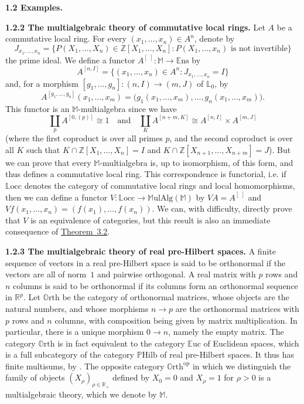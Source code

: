 \documentclass{article}
\newenvironment{rmenv}[1]
  {\phantomsection\par\medskip\noindent\textbf{#1.}\rmfamily}
  {\medskip}
\newcommand{\bb}[1]{{\mathbb{#1}}}
\newcommand{\op}{{\mathrm{op}}}
\newcommand{\Set}{\mathbb{E}\mathrm{ns}}
\newcommand{\MulAlg}{\mathbb{M}\mathrm{ulAlg}}
\newcommand{\Locc}{\mathbb{L}\mathrm{occ}}
\newcommand{\Orth}{\mathbb{O}\mathrm{rth}}
\newcommand{\Euc}{\mathbb{E}\mathrm{uc}}
\newcommand{\PHilb}{\mathbb{P}\mathrm{Hilb}}
\newcommand{\oldpage}[1]{\marginpar{\footnotesize$\Big\vert$ \textit{p.~#1}}}
\begin{document}
\begin{rmenv}{1.2 Examples}
\begin{rmenv}{1.2.2 The multialgebraic theory of commutative local rings}
    Let $A$ be a commutative local ring.
    For every $(x_1,\ldots,x_n)\in A^n$, denote by
    \[
      J_{x_1,\ldots,x_n} =
      \big\{
        P(X_1,\ldots,X_n)\in\bb{Z}[X_1,\ldots,X_n]
        :
        \mbox{$P(X_1,\ldots,x_n)$ is not invertible}
      \big\}
    \]
\oldpage{196}
    the prime ideal.
    We define a functor  $A^{[\,\,]}\colon\bb{M}\to\Set$ by
    \[
      A^{[n,I]}=\{(x_1,\ldots,x_n)\in A^n:J_{x_1,\ldots,x_n}=I\}
    \]
    and, for a morphism $[g_1,\ldots,g_n]\colon(n,I)\to(m,J)$ of $\bb{L}_0$, by
    \[
      A^{[g_1,\ldots,g_n]}(x_1,\ldots,x_m) =
      \big(
        g_1(x_1,\ldots,x_m),
        \ldots,
        g_n(x_1,\ldots,x_m)
      \big).
    \]
    This functor is an $\bb{M}$-multialgebra since we have
    \[
      \coprod_p A^{[0,(p)]} \cong 1
      \quad\text{and}\quad
      \coprod_K A^{[n+m,K]} \cong A^{[n,I]}\times A^{[m,J]}
    \]
    (where the first coproduct is over all primes $p$, and the second coproduct is over all $K$ such that $K\cap\bb{Z}[X_1,\ldots,X_n] = I$ and $K\cap\bb{Z}[X_{n+1},\ldots,X_{n+m}] = J$).
    But we can prove that every $\bb{M}$-multialgebra is, up to isomorphism, of this form, and thus defines a commutative local ring.
    This correspondence is functorial, i.e. if $\Locc$ denotes the category of commutative local rings and local homomorphisms, then we can define a functor $V\colon\Locc\to\MulAlg(\bb{M})$ by $VA=A^{[\,\,]}$ and $Vf(x_1,\ldots,x_n)=(f(x_1),\ldots,f(x_n))$.
    We can, with difficulty, directly prove that $V$ is an equivalence of categories, but this result is also an immediate consequence of \hyperref[3.2]{Theorem~3.2}.
  \end{rmenv}

  \begin{rmenv}{1.2.3 The multialgebraic theory of real pre-Hilbert spaces}
  \label{1.2.3}
    A finite sequence of vectors in a real pre-Hilbert space is said to be orthonormal if the vectors are all of norm~$1$ and pairwise orthogonal.
    A real matrix with $p$ rows and $n$ columns is said to be orthonormal if its columns form an orthonormal sequence in $\bb{R}^p$.
    Let $\Orth$ be the category of orthonormal matrices, whose objects are the natural numbers, and whose morphisms $n\to p$ are the orthonormal matrices with $p$ rows and $n$ columns, with composition being given by matrix multiplication.
    In particular, there is a unique morphism $0\to n$, namely the empty matrix.
    The category $\Orth$ is in fact equivalent to the category $\Euc$ of Euclidean spaces, which is a full subcategory of the category $\PHilb$ of real pre-Hilbert spaces.
    It thus has finite multisums, by \cite[{}1.1.3]{2}.
    The opposite category $\Orth^\op$ in which we distinguish the family of objects $(X_\rho)_{\rho\in\bb{R}_+}$ defined by $X_0=0$ and $X_\rho=1$ for $\rho>0$ is a multialgebraic theory, which we denote by $\bb{M}$.


\end{rmenv}
\end{rmenv}
\end{document}
